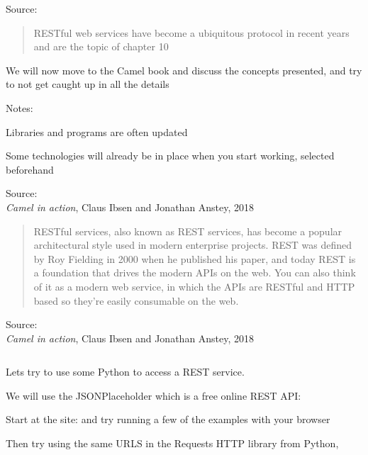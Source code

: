 \documentclass[Screen16to9,17pt]{foils}
\begin{document}
Source: 



\begin{quote}
RESTful web services have become a ubiquitous protocol in recent years and
  are the topic of chapter 10
\end{quote}

We will now move to the Camel book and discuss the concepts presented, and try to not get caught up in all the details

Notes:
\begin{list2}
\item Libraries and programs are often updated
\item Some technologies will already be in place when you start working, selected beforehand
\end{list2}

Source: {\footnotesize\\
\emph{Camel in action}, Claus Ibsen and Jonathan Anstey, 2018}





\begin{quote}
  RESTful services, also known as REST services, has become a popular architectural style
  used in modern enterprise projects. REST was defined by Roy Fielding in 2000 when
  he published his paper, and today REST is a foundation that drives the modern APIs
  on the web. You can also think of it as a modern web service, in which the APIs are
  RESTful and HTTP based so they’re easily consumable on the web.
\end{quote}

Source: {\footnotesize\\
\emph{Camel in action}, Claus Ibsen and Jonathan Anstey, 2018}





\inputminted{python}{programs/rest-1.py}

\begin{list2}
\item  Lets try to use some Python to access a REST service.
\item  We will use the JSONPlaceholder which is a free online REST API:
\item Start at the site:  and try running a few of the examples with your browser
\item Then try using the same URLS in the Requests HTTP library from Python,\\
\end{list2}
\end{document}
